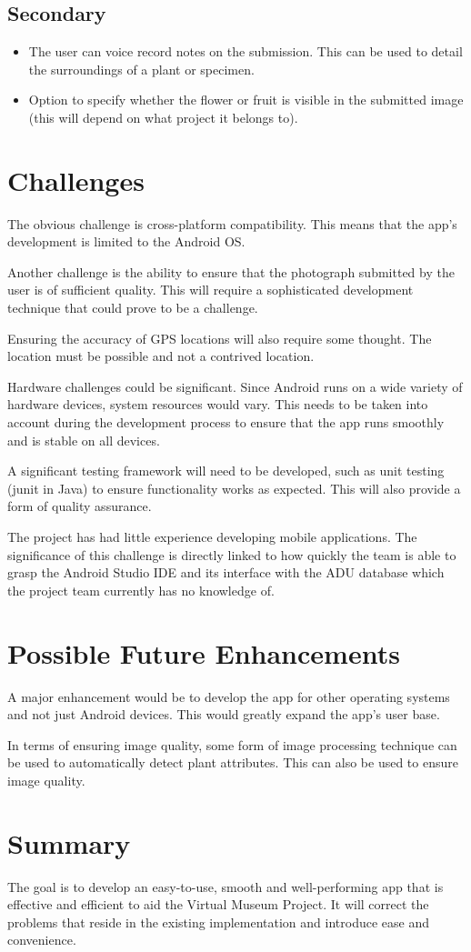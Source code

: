 \documentclass[12pt,a4paper,oneside]{report}
\begin{document}
\subsection{Secondary}
    \begin{itemize}
      \item The user can voice record notes on the submission.  This can be used to detail the surroundings of a plant or specimen.
      \item Option to specify whether the flower or fruit is visible in the submitted image (this will depend on what project it belongs to).
    \end{itemize}
\section{Challenges}
  \begin{spacing}{1.4}
    The obvious challenge is cross-platform compatibility. This means that the app's development is limited to the Android OS.

    Another challenge is the ability to ensure that the photograph submitted by the user is of sufficient quality. This will require a sophisticated development technique that could prove to be a challenge.

    Ensuring the accuracy of GPS locations will also require some thought. The location must be possible and not a contrived location.

    Hardware challenges could be significant. Since Android runs on a wide variety of hardware devices, system resources would vary. This needs to be taken into account during the development process to ensure that the app runs smoothly and is stable on all devices.

    A significant testing framework will need to be developed, such as unit testing (junit in Java) to ensure functionality works as expected. This will also provide a form of quality assurance.

		The project has had little experience developing mobile applications.  The significance of this challenge is directly linked to how quickly the team is able to grasp the Android Studio IDE and its interface with the ADU database which the project team currently has no knowledge of.
  \end{spacing}
\section{Possible Future Enhancements}
  \begin{spacing}{1.4}
    A major enhancement would be to develop the app for other operating systems and not just Android devices. This would greatly expand the app's user base.

    In terms of ensuring image quality, some form of image processing technique can be used to automatically detect plant attributes. This can also be used to ensure image quality.
  \end{spacing}
\section{Summary}
  The goal is to develop an easy-to-use, smooth and well-performing app that is effective and efficient to aid the Virtual Museum Project.
  It will correct the problems that reside in the existing implementation and introduce ease and convenience.
\end{document}
